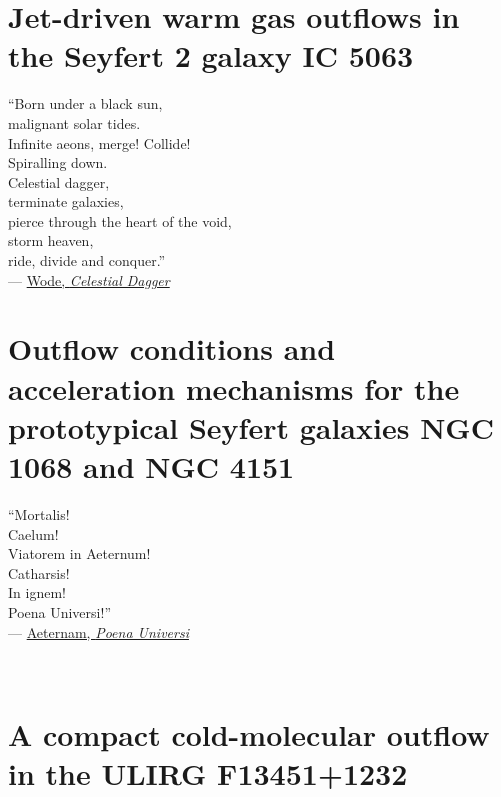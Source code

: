 \documentclass[12pt, twoside, openright]{report}
\begin{document}
\chapter{Jet-driven warm gas outflows in the Seyfert 2 galaxy IC 5063}
\label{chapter: xshooter_ic5063}

\vspace*{2cm}
\vbox{\large``Born under a black sun, \\
malignant solar tides. \\
Infinite aeons, merge! Collide! \\
Spiralling down. \\

\noindent
Celestial dagger, \\
terminate galaxies, \\
pierce through the heart of the void, \\
storm heaven, \\
ride, divide and conquer.''\\

--- \href{https://wode.bandcamp.com/album/servants-of-the-countercosmos}{Wode, \textit{Celestial Dagger}}}
\newpage
\noindent



\chapter{Outflow conditions and acceleration mechanisms for the prototypical Seyfert galaxies NGC 1068 and NGC 4151}
\label{chapter: stis_seyferts}

\vspace*{2cm}
\vbox{\large``Mortalis!\\
Caelum!\\
Viatorem in Aeternum!\\
Catharsis!\\
In ignem! \\
Poena Universi!''\\


--- \href{https://aeternam.bandcamp.com/album/al-qassam}{Aeternam, \textit{Poena Universi}}}

\newpage
\noindent


\newpage
\thispagestyle{plain}
~\newpage

\chapter{A compact cold-molecular outflow in the ULIRG F13451+1232}
\label{chapter: alma_f13451_1232}
\end{document}

